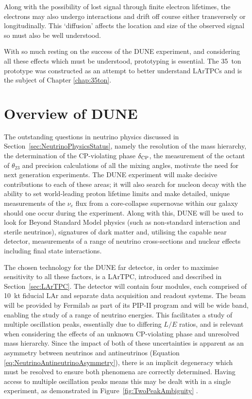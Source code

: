 Along with the possibility of lost signal through finite electron lifetimes, the electrons may also undergo interactions and drift off course either transversely or longitudinally.  This `diffusion' affects the location and size of the observed signal so must also be well understood.

With so much resting on the success of the DUNE experiment, and considering all these effects which must be understood, prototyping is essential.  The 35~ton prototype was constructed as an attempt to better understand LArTPCs and is the subject of Chapter \ref{chap:35ton}.

\section{Overview of DUNE}\label{sec:DUNEOverview}

The outstanding questions in neutrino physics discussed in Section~\ref{sec:NeutrinoPhysicsStatus}, namely the resolution of the mass hierarchy, the determination of the CP-violating phase $\delta_{\textnormal{CP}}$, the measurement of the octant of $\theta_{23}$ and precision calculations of all the mixing angles, motivate the need for next generation experiments.  The DUNE experiment will make decisive contributions to each of these areas; it will also search for nucleon decay with the ability to set world-leading proton lifetime limits and make detailed, unique measurements of the $\nu_e$ flux from a core-collapse supernovae within our galaxy should one occur during the experiment.  Along with this, DUNE will be used to look for Beyond Standard Model physics (such as non-standard interaction and sterile neutrinos), signatures of dark matter and, utilising the capable near detector, measurements of a range of neutrino cross-sections and nuclear effects including final state interactions.

The chosen technology for the DUNE far detector, in order to maximise sensitivity to all these factors, is a LArTPC, introduced and described in Section~\ref{sec:LArTPC}.  The detector will contain four modules, each comprised of 10~kt fiducial LAr and separate data acquisition and readout systems.  The beam will be provided by Fermilab as part of its PIP-II program \cite{PIPII2013} and will be wide band, enabling the study of a range of neutrino energies.  This facilitates a study of multiple oscillation peaks, essentially due to differing $L/E$ ratios, and is relevant when considering the effects of an unknown CP-violating phase and unresolved mass hierarchy.  Since the impact of both of these uncertainties is apparent as an asymmetry between neutrinos and antineutrinos (Equation \ref{eq:NeutrinoAntineutrinoAsymmetry}), there is an implicit degeneracy which must be resolved to ensure both phenomena are correctly determined.  Having access to multiple oscillation peaks means this may be dealt with in a single experiment, as demonstrated in Figure~\ref{fig:TwoPeakAmbiguity} \cite{Huber2011}.

